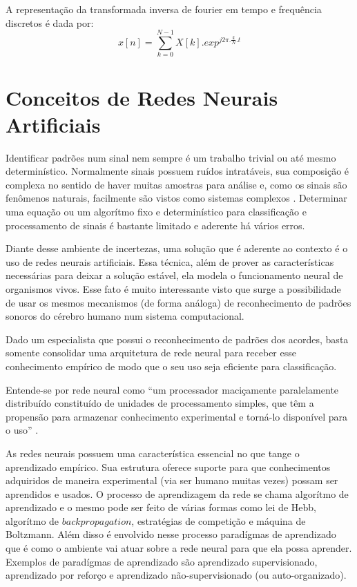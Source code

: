 A representação da transformada inversa de fourier em tempo e frequência discretos é dada por:
\begin{equation}
\label{eqn13}
	x[n] = \sum_{k=0}^{N - 1}{X[k].{exp}^{j2\pi.\frac{k}{N}.t}}
\end{equation}


\section{Conceitos de Redes Neurais Artificiais}
\label{sec:conceitosredesneurais}

Identificar padrões num sinal nem sempre é um trabalho trivial ou até mesmo determinístico. Normalmente sinais possuem ruídos intratáveis, sua composição é complexa no sentido de haver muitas amostras para análise e, como os sinais são fenômenos naturais, facilmente são vistos como sistemas complexos \cite{morin}. Determinar uma equação ou um algorítmo fixo e determinístico para classificação e processamento de sinais é bastante limitado e aderente há vários erros.

Diante desse ambiente de incertezas, uma solução que é aderente ao contexto é o uso de redes neurais artificiais. Essa técnica, além de prover as características necessárias para deixar a solução estável, ela modela o funcionamento neural de organismos vivos. Esse fato é muito interessante visto que surge a possibilidade de usar os mesmos mecanismos (de forma análoga) de reconhecimento de padrões sonoros do cérebro humano num sistema computacional.

Dado um especialista que possui o reconhecimento de padrões dos acordes, basta somente consolidar uma arquitetura de rede neural para receber esse conhecimento empírico de modo que o seu uso seja eficiente para classificação.

Entende-se por rede neural como ``um processador maciçamente paralelamente distribuído constituído de unidades de processamento simples, que têm a propensão para armazenar conhecimento experimental e torná-lo disponível para o uso'' \cite{haykin2009neural}.

As redes neurais possuem uma característica essencial no que tange o aprendizado empírico. Sua estrutura oferece suporte para que conhecimentos adquiridos de maneira experimental (via ser humano muitas vezes) possam ser aprendidos e usados. O processo de aprendizagem da rede se chama algorítmo de aprendizado e o mesmo pode ser feito de várias formas como lei de Hebb, algorítmo de $backpropagation$, estratégias de competição e máquina de Boltzmann. Além disso é envolvido nesse processo paradígmas de aprendizado que é como o ambiente vai atuar sobre a rede neural para que ela possa aprender. Exemplos de paradígmas de aprendizado são aprendizado supervisionado, aprendizado por reforço e aprendizado não-supervisionado (ou auto-organizado).

